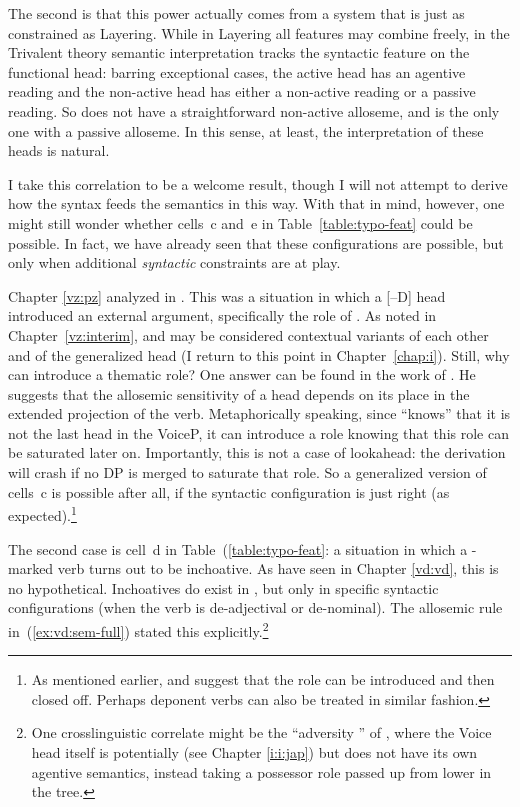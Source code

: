 \begin{exe}
\begin{xlist}
\begin{exe}
\begin{exe}
\begin{xlist}
\begin{exe}
\begin{exe}
\begin{exe}
\begin{exe}
\begin{exe}
\begin{xlist}
\label{r1:6:2}The second is that this power actually comes from a system that is just as constrained as Layering. While in Layering all features may combine freely, in the Trivalent theory semantic interpretation tracks the syntactic feature on the functional head: barring exceptional cases, the active head {\vd} has an agentive reading and the non-active head {\vz} has either a non-active reading or a passive reading. So {\vd} does not have a straightforward non-active alloseme, and {\vz} is the only one with a passive alloseme. In this sense, at least, the interpretation of these heads is natural.

I take this correlation to be a welcome result, though I will not attempt to derive how the syntax feeds the semantics in this way. With that in mind, however, one might still wonder whether cells~c and~e in Table~\ref{table:typo-feat} could be possible. In fact, we have already seen that these configurations are possible, but only when additional \emph{syntactic} constraints are at play.

Chapter \ref{vz:pz} analyzed  in {\tnif}. This was a situation in which a [--D] head introduced an external argument, specifically the  role of {\pz}. As noted in Chapter~\ref{vz:interim}, {\pz} and {\vz} may be considered contextual variants of each other and of the generalized head \emph{} (I return to this point in Chapter~\ref{chap:i}). Still, why can {\pz} introduce a thematic role? One answer can be found in the work of \cite{wood15springer}. He suggests that the allosemic sensitivity of a head depends on its place in the extended projection of the verb. Metaphorically speaking, since {\pz} ``knows'' that it is not the last head in the VoiceP, it can introduce a  role knowing that this role can be saturated later on. Importantly, this is not a case of lookahead: the derivation will crash if no DP is merged to saturate that role. So a generalized version of cells~c is possible after all, if the syntactic configuration is just right (as expected).\footnote{As mentioned earlier, \cite{legate14} and \cite{akkus19jl} suggest that the  role can be introduced and then closed off. Perhaps deponent verbs can also be treated in similar fashion.}

The second case is cell~d in Table~(\ref{table:typo-feat}: a situation in which a -marked verb turns out to be inchoative. As have seen in Chapter \ref{vd:vd}, this is no hypothetical. Inchoatives do exist in {\thif}, but only in specific syntactic configurations (when the verb is de-adjectival or de-nominal). The allosemic rule in~(\ref{ex:vd:sem-full}) stated this explicitly.\footnote{One crosslinguistic correlate might be the ``adversity '' of  \citep{pylkkanen08,woodmarantz17}, where the Voice head itself is potentially {\vd} (see Chapter \ref{i:i:jap}) but does not have its own agentive semantics, instead taking a possessor role passed up from lower in the tree.}


\end{xlist}
\end{exe}
\end{exe}
\end{exe}
\end{exe}
\end{exe}
\end{xlist}
\end{exe}
\end{exe}
\end{xlist}
\end{exe}
